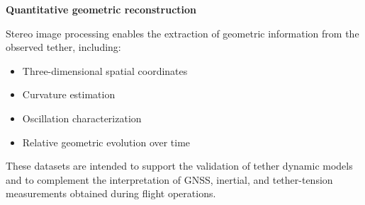 \vspace{0.5cm}
\noindent \textbf{Quantitative geometric reconstruction}
\vspace{0.2cm}

Stereo image processing enables the extraction of geometric information from the observed tether, including:
\begin{itemize}
    \item Three-dimensional spatial coordinates
    \item Curvature estimation
    \item Oscillation characterization
    \item Relative geometric evolution over time
\end{itemize}

These datasets are intended to support the validation of tether dynamic models and to complement the interpretation of GNSS, inertial, and tether-tension measurements obtained during flight operations.











